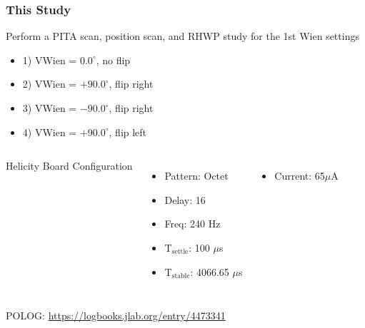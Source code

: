 \begin{frame}
	\frametitle{This Study}
	Perform a PITA scan, position scan, and RHWP study for the 1st Wien settings
	\begin{itemize}
			\item<1>[\textbullet] 1) VWien = $0.0^\circ$, no flip
			\item<0>[\textbullet] 2) VWien = $+90.0^\circ$, flip right
			\item<0>[\textbullet] 3) VWien = $-90.0^\circ$, flip right
			\item<0>[\textbullet] 4) VWien = $+90.0^\circ$, flip left
	\end{itemize}
	\vspace{3mm}
	\begin{columns}
			Helicity Board Configuration
			\begin{itemize}
			\item<1>[\textbullet] Pattern: Octet
			\item<1>[\textbullet] Delay:   16
			\item<1>[\textbullet] Freq:    240 Hz
			\item<1>[\textbullet] T$_\text{settle}$: 100 $\mu$s
			\item<1>[\textbullet] T$_\text{stable}$: 4066.65 $\mu$s
		\end{itemize}
		\begin{itemize}
			\item<1>[\textbullet] Current: 65$\mu$A
		\end{itemize}
	\end{columns}
	\vspace{3mm}
	POLOG: \url{https://logbooks.jlab.org/entry/4473341}
\end{frame}